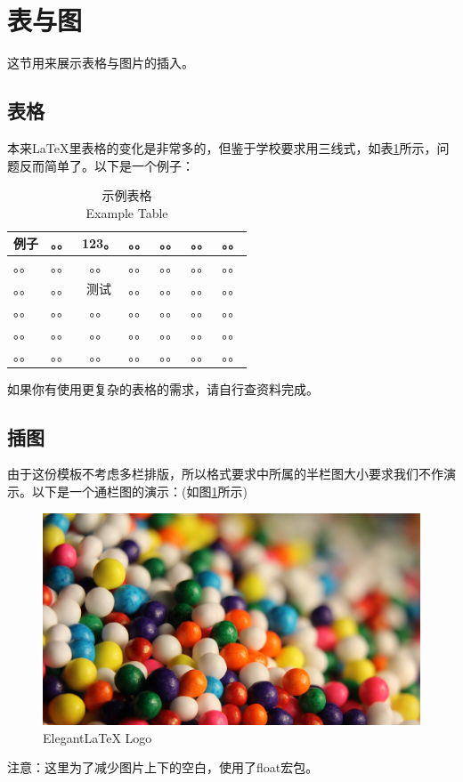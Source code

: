 \section{表与图}这节用来展示表格与图片的插入。

\subsection{表格}
\par 本来LaTeX里表格的变化是非常多的，但鉴于学校要求用三线式，如表\ref{table:example}所示，问题反而简单了。以下是一个例子：
\begin{table}[htbp]\center\songti{}
    \caption{示例表格\\Example Table}
         \label{table:example}
    \begin{tabular}{lcccccl}
     \toprule
     例子 & 。。 & 123。 & 。。 & 。。& 。。 & 。。\\
     \midrule
    。。 & 。。 & 。。 & 。。 & 。。& 。。 & 。。\\
    。。 & 。。 & 测试 & 。。 & 。。& 。。 & 。。\\
    。。 & 。。 & 。。 & 。。 & 。。& 。。 & 。。\\
    。。 & 。。 & 。。 & 。。 & 。。& 。。 & 。。\\
    。。 & 。。 & 。。 & 。。 & 。。& 。。 & 。。\\
     \bottomrule
    \end{tabular}
   \end{table}
如果你有使用更复杂的表格的需求，请自行查资料完成。

\subsection{插图}
由于这份模板不考虑多栏排版，所以格式要求中所属的半栏图大小要求我们不作演示。以下是一个通栏图的演示：(如图\ref{fig:logo}所示)

\begin{figure}[H]
	\centering
	\includegraphics[width=0.3\linewidth]{./figures/figure_example1.jpg}
	\caption{ElegantLaTeX Logo}
	\label{fig:logo}
\end{figure}


\par 注意：这里为了减少图片上下的空白，使用了float宏包。